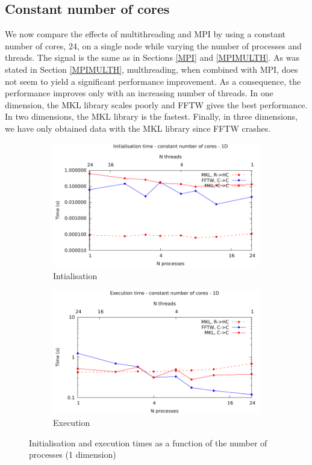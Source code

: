 \documentclass[12pt, a4paper]{article}
\begin{document}
\subsection{Constant number of cores}\label{CONST}
We now compare the effects of multithreading and MPI by using a constant number of cores, 24, on a single node while varying the number of processes and threads. The signal is the same as in Sections \ref{MPI} and \ref{MPIMULTH}. As was stated in Section \ref{MPIMULTH}, multhreading, when combined with MPI, does not seem to yield a significant performance improvement. As a consequence, the performance improves only with an increasing number of threads. In one dimension, the MKL library scales poorly and FFTW gives the best performance. In two dimensions, the MKL library is the fastest. Finally, in three dimensions, we have only obtained data with the MKL library since FFTW crashes.
\begin{figure}[H]
\captionsetup{width=0.8\linewidth}
\centering
\begin{subfigure}{.5\textwidth}
\centering
\includegraphics[width=.9\linewidth]{graphs/const-init-1d.pdf}
\caption{Intialisation}
\label{1DCONSTI}
\end{subfigure}%
\begin{subfigure}{.5\textwidth}
\centering
\includegraphics[width=.9\linewidth]{graphs/const-exec-1d.pdf}
\caption{Execution}
\label{1DCONSTE}
\end{subfigure}
\caption{Initialisation and execution times as a function of the number of processes (1 dimension)}
\label{1DCONST}
\end{figure}
\end{document}
